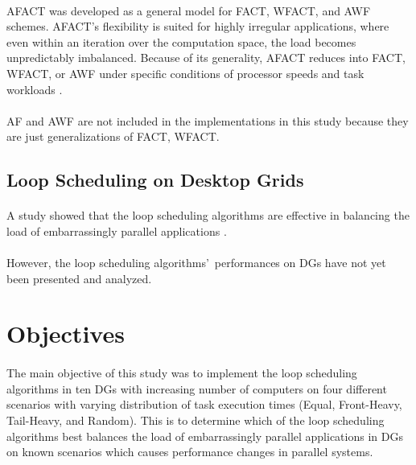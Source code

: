 \documentclass[10pt, twocolumn, letterpaper]{article}
\begin{document}
\paragraph{}
AFACT was developed as a general model for FACT, WFACT, and AWF schemes. AFACT’s flexibility is suited for highly irregular applications, where even within an iteration over the computation space, the load becomes unpredictably imbalanced. Because of its generality, AFACT reduces into FACT, WFACT, or AWF under specific conditions of processor speeds and task workloads \cite{pabico}.

\paragraph{}
AF and AWF are not included in the implementations in this study because they are just generalizations of FACT, WFACT. 

\subsection{Loop Scheduling on Desktop Grids}

\paragraph{}
A study showed that the loop scheduling algorithms are effective in balancing the load of embarrassingly parallel applications \cite{pabico}.

\paragraph{}
However, the loop scheduling algorithms\rq\ performances on DGs have not yet been presented and analyzed.

\section{Objectives}

\paragraph{}
The main objective of this study was to implement the loop scheduling algorithms in ten DGs with increasing number of computers on four different scenarios with varying distribution of task execution times (Equal, Front-Heavy, Tail-Heavy, and Random). This is to determine which of the loop scheduling algorithms best balances the load of embarrassingly parallel applications in DGs on known scenarios which causes performance changes in parallel systems.
\end{document}
